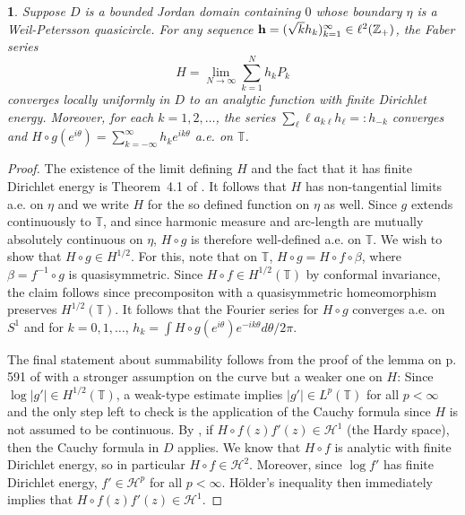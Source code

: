\documentclass{article}
\numberwithin{equation}{section}
\numberwithin{figure}{section}
\theoremstyle{plain}
\theoremstyle{plain}
\newtheorem{lemma}[thm]{\protect\lemmaname}
\numberwithin{thm}{section}
\theoremstyle{remark}
\providecommand{\lemmaname}{Lemma}
\newcommand{\T}{\mathbb{T}}
\newcommand{\Z}{\mathbb{Z}}
\begin{document}
\begin{lemma}\label{lem:Faber-Fourier}
Suppose $D$ is a bounded Jordan domain containing $0$ whose boundary $\eta$ is a Weil-Petersson quasicircle. For any sequence ${\bf h}=(\sqrt{k} h_{k})_{k=1}^\infty \in \ell^2(\Z_+)$, the Faber series
\[H = \lim_{N \to \infty} \sum_{k=1}^N h_k P_k\] 
converges locally uniformly in $D$ to an analytic function with finite Dirichlet energy. Moreover, for each $k =1,2 ,\ldots$, the series $\sum_\ell \ell a_{k\ell} h_\ell=: h_{-k}$ converges and $H \circ g(e^{i\theta})=\sum_{k=-\infty}^\infty h_k e^{ik \theta}$ a.e. on $\T$. 
\end{lemma}
\begin{proof}
The existence of the limit defining $H$ and the fact that it has finite Dirichlet energy is Theorem~4.1 of \cite{Shen09}. It follows that $H$ has non-tangential limits a.e. on $\eta$ and we write $H$ for the so defined function on $\eta$ as well. Since $g$ extends continuously to $\mathbb{T}$, and since harmonic measure and arc-length are mutually absolutely continuous on $\eta$, $H \circ g$ is therefore well-defined a.e. on $\mathbb{T}$. We wish to show that $H \circ g \in H^{1/2}$. For this, note that on $\T$, $H\circ g = H \circ f \circ \beta$, where $\beta = f^{-1} \circ g$ is quasisymmetric. Since $H \circ f \in H^{1/2}(\mathbb{T})$ by conformal invariance, the claim follows since precompositon with a quasisymmetric homeomorphism preserves $H^{1/2}(\mathbb{T})$. It follows that the Fourier series for $H \circ g$ converges a.e. on $S^1$ and for $k=0,1,\ldots$, $h_k = \int H \circ g(e^{i\theta}) e^{-ik\theta} d\theta/2\pi$. 



The final statement about summability follows from the proof of the lemma on p. 591 of \cite{curtiss} with a stronger assumption on the curve but a weaker one on $H$: Since $\log |g'| \in H^{1/2}(\mathbb{T})$, a weak-type estimate implies $|g'| \in L^p(\mathbb{T})$ for all $p < \infty$ and the only step left to check is the application of the Cauchy formula since $H$ is not assumed to be continuous. By \cite[Theorem 10.4]{Duren}, if $H \circ f(z) f'(z) \in \mathcal{H}^1$ (the Hardy space), then the Cauchy formula in $D$ applies. We know that $H\circ f$ is analytic with finite Dirichlet energy, so in particular $H\circ f \in \mathcal{H}^2$. Moreover, since $\log f'$ has finite Dirichlet energy, $f' \in \mathcal{H}^p$ for all $p < \infty$. H\"older's inequality then immediately implies that $H \circ f(z) f'(z) \in \mathcal{H}^1$.
\end{proof}
\end{document}
